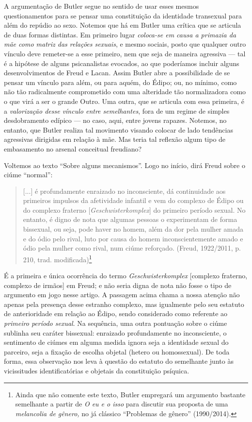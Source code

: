 A argumentação de Butler segue no sentido de usar esses mesmos
questionamentos para se pensar uma constituição da identidade transexual
para além do repúdio ao sexo. Notemos que há em Butler uma crítica que
se articula de duas formas distintas. Em primeiro lugar \emph{coloca-se
em causa a primazia da mãe como matriz das relações sexuais}, e mesmo
sociais, posto que qualquer outro vínculo deve remeter-se a esse
primeiro, nem que seja de maneira agressiva --- tal é a hipótese de
alguns psicanalistas evocados, ao que poderíamos incluir alguns
desenvolvimentos de Freud e Lacan. Assim Butler abre a possibilidade de
se pensar um vínculo para além, ou para aquém, do Édipo; ou, no mínimo,
como não tão radicalmente comprometido com uma alteridade tão
normalizadora como o que virá a ser o grande Outro. Uma outra, que se
articula com essa primeira, é a \emph{valorização desse vínculo entre
semelhantes}, fora de um regime de simples desdobramento edípico --- no
caso, aqui, entre jovens rapazes. Notemos, no entanto, que Butler
realiza tal movimento visando colocar de lado tendências agressivas
dirigidas em relação à mãe. Mas teria tal reflexão algum tipo de
embasamento no arsenal conceitual freudiano?

Voltemos ao texto ``Sobre alguns mecanismos''. Logo no início,
dirá Freud sobre o ciúme ``normal'':

\begin{quote}
{[}...{]} é profundamente enraizado no inconsciente, dá continuidade aos
primeiros impulsos da afetividade infantil e vem do complexo de Édipo ou
do complexo fraterno {[}\emph{Geschwisterkomplex}{]} do primeiro período
sexual. No entanto, é digno de nota que algumas pessoas o experimentam
de forma bissexual, ou seja, pode haver no homem, além da dor pela
mulher amada e do ódio pelo rival, luto por causa do homem
inconscientemente amado e ódio pela mulher como rival, num ciúme
reforçado. (Freud, 1922/2011, p. 210, trad. modificada)\footnote{Ainda
  que não comente este texto, Butler empregará um argumento bastante
  semelhante a partir de \emph{O eu e o isso} para discutir sua proposta
  de uma \emph{melancolia de gênero,} no já clássico ``Problemas de
  gênero'' (1990/2014).}
\end{quote}

É a primeira e única ocorrência do termo \emph{Geschwisterkomplex}
{[}complexo fraterno, complexo de irmãos{]} em Freud; e não seria digna
de nota não fosse o tipo de argumento em jogo nesse artigo. A passagem
acima chama a nossa atenção não apenas pela presença desse estranho
complexo, mas igualmente pelo seu estatuto de anterioridade em relação
ao Édipo, sendo considerado como referente ao \emph{primeiro período
sexual}. Na sequência, uma outra pontuação sobre o ciúme sublinha seu
caráter bissexual: enraizado profundamente no inconsciente, o sentimento
de ciúmes em alguma medida ignora seja a identidade sexual do parceiro,
seja a fixação de escolha objetal (hetero ou homossexual). De toda
forma, essa observação nos leva à questão do estatuto do semelhante
junto às vicissitudes identificatórias e objetais da constituição
psíquica.

